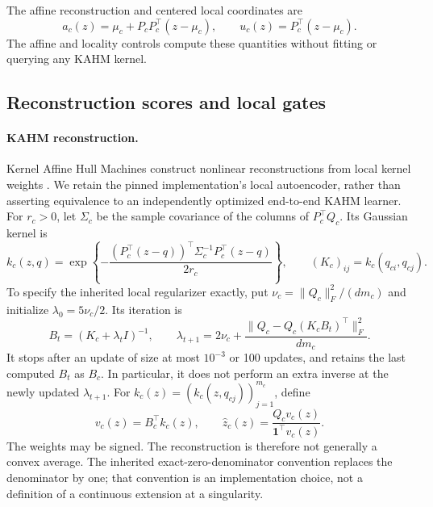 The affine reconstruction and centered local coordinates are
\begin{equation}
 a_c(z)=\mu_c+P_cP_c^\top(z-\mu_c),
 \qquad u_c(z)=P_c^\top(z-\mu_c).
 \label{eq:nf-affine}
\end{equation}
The affine and locality controls compute these quantities without fitting or
querying any KAHM kernel.

\subsection{Reconstruction scores and local gates}
\label{sec:nf-gates}

\paragraph{KAHM reconstruction.}
Kernel Affine Hull Machines construct nonlinear reconstructions from local
kernel weights \citep{Kumar2024KAHM}.  We retain the pinned implementation's
local autoencoder, rather than asserting equivalence to an independently
optimized end-to-end KAHM learner.  For $r_c>0$, let $\Sigma_c$ be the sample
covariance of the columns of $P_c^\top Q_c$.  Its Gaussian kernel is
\begin{equation}
 k_c(z,q)=\exp\!\left\{-\frac{
  (P_c^\top(z-q))^\top\Sigma_c^{-1}P_c^\top(z-q)}{2r_c}\right\},
 \qquad (K_c)_{ij}=k_c(q_{ci},q_{cj}).
 \label{eq:nf-kahm-kernel}
\end{equation}
To specify the inherited local regularizer exactly, put
$\nu_c=\|Q_c\|_F^2/(dm_c)$ and initialize $\lambda_0=5\nu_c/2$.  Its iteration is
\begin{equation}
 B_t=(K_c+\lambda_t I)^{-1},\qquad
 \lambda_{t+1}=2\nu_c+
 \frac{\|Q_c-Q_c(K_cB_t)^\top\|_F^2}{dm_c}.
 \label{eq:nf-local-regularizer}
\end{equation}
It stops after an update of size at most $10^{-3}$ or 100 updates, and
retains the last computed $B_t$ as $B_c$.  In particular, it does not perform
an extra inverse at the newly updated $\lambda_{t+1}$.
For $k_c(z)=(k_c(z,q_{cj}))_{j=1}^{m_c}$, define
\begin{equation}
 v_c(z)=B_c^\top k_c(z),\qquad
 \widehat z_c(z)=\frac{Q_cv_c(z)}{\mathbf 1^\top v_c(z)}.
 \label{eq:nf-reconstruction}
\end{equation}
The weights may be signed.  The reconstruction is therefore not generally a
convex average.  The inherited exact-zero-denominator convention replaces
the denominator by one; that convention is an implementation choice, not
a definition of a continuous extension at a singularity.

